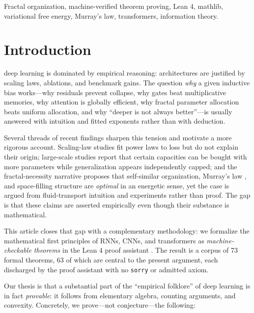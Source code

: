 \documentclass[journal]{IEEEtran}
\begin{document}
\begin{IEEEkeywords}
Fractal organization, machine-verified theorem proving, Lean 4, mathlib,
variational free energy, Murray's law, transformers, information theory.
\end{IEEEkeywords}

\section{Introduction}
 deep learning is dominated by empirical reasoning:
architectures are justified by scaling laws, ablations, and benchmark gains.
The question \emph{why} a given inductive bias works---why residuals prevent
collapse, why gates beat multiplicative memories, why attention is globally
efficient, why fractal parameter allocation beats uniform allocation, and why
``deeper is not always better''---is usually answered with intuition and fitted
exponents rather than with deduction.

Several threads of recent findings sharpen this tension and motivate a more
rigorous account. Scaling-law studies \cite{kaplan2020scaling,hoffmann2022train}
fit power laws to loss but do not explain their origin; large-scale studies
report that certain capacities can be bought with more parameters while
generalization appears independently capped; and the fractal-necessity
narrative \cite{shape2026} proposes that self-similar organization, Murray's law
\cite{murray1926}, and space-filling structure are \emph{optimal} in an
energetic sense, yet the case is argued from fluid-transport intuition and
experiments rather than proof. The gap is that these claims are asserted
empirically even though their substance is mathematical.

This article closes that gap with a complementary methodology: we formalize the
mathematical first principles of RNNs, CNNs, and transformers as
\emph{machine-checkable theorems} in the Lean 4 proof assistant
\cite{lean4,mathlib,avigad2020}. The result is a corpus of 73 formal theorems,
63 of which are central to the present argument, each discharged by the proof
assistant with no \texttt{sorry} or admitted axiom.

Our thesis is that a substantial part of the ``empirical folklore'' of deep
learning is in fact \emph{provable}: it follows from elementary algebra,
counting arguments, and convexity. Concretely, we prove---not conjecture---the
following:
\end{document}
